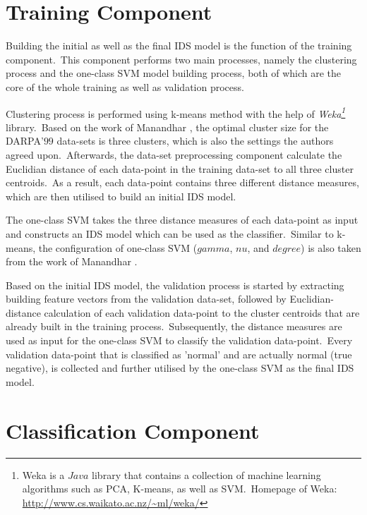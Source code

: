 		 
	\section{Training Component}
	\label{trainingComponent}
		
		Building the initial as well as the final IDS model is the function of the training component.\ This component performs two main processes, namely the clustering process and the one-class SVM model building process, both of which are the core of the whole training as well as validation process.

		Clustering process is performed using k-means method with the help of \textit{Weka\footnote{Weka is a $Java$ library that contains a collection of machine learning algorithms such as PCA, K-means, as well as SVM.\ Homepage of Weka: \url{http://www.cs.waikato.ac.nz/~ml/weka/}}} library.\ Based on the work of Manandhar \cite{Manandhar:TowardsPracticalAnomalyBasedIDS}, the optimal cluster size for the DARPA'$99$ data-sets is three clusters, which is also the settings the authors agreed upon.\ Afterwards, the data-set preprocessing component calculate the Euclidian distance of each data-point in the training data-set to all three cluster centroids.\ As a result, each data-point contains three different distance measures, which are then utilised to build an initial IDS model.
		
		The one-class SVM takes the three distance measures of each data-point as input and constructs an IDS model which can be used as the classifier.\ Similar to k-means, the configuration of one-class SVM ($gamma$, $nu$, and $degree$) is also taken from the work of Manandhar \cite{Manandhar:TowardsPracticalAnomalyBasedIDS}.
		
		Based on the initial IDS model, the validation process is started by extracting building feature vectors from the validation data-set, followed by Euclidian-distance calculation of each validation data-point to the cluster centroids that are already built in the training process.\ Subsequently, the distance measures are used as input for the one-class SVM to classify the validation data-point.\ Every validation data-point that is classified as 'normal' and are actually normal (true negative), is collected and further utilised by the one-class SVM as the final IDS model.
		
	\section{Classification Component}
	\label{classificationComponent}
		 
